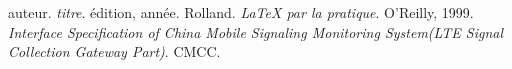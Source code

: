 \begin{thebibliography}{ABC}	
     auteur. \emph{titre}. édition, année.
     Rolland. \emph{LaTeX par la pratique}. O'Reilly, 1999.
      \emph{Interface Specification of China Mobile Signaling Monitoring System(LTE Signal Collection Gateway Part)}. CMCC.
\end{thebibliography}
